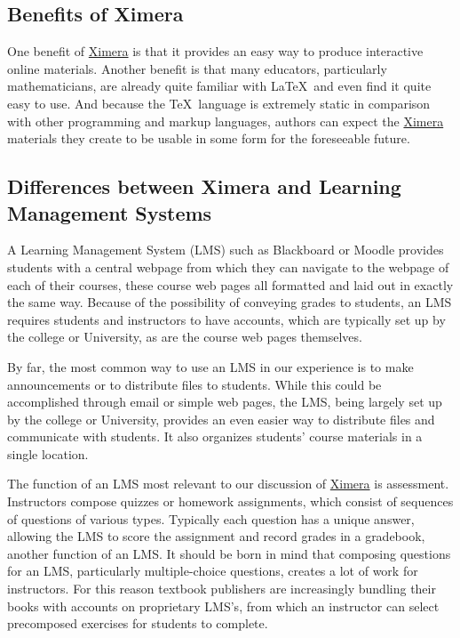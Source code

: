 \documentclass{ximera}
\begin{document}
\subsection{Benefits of Ximera}
One benefit of \href{http://ximera.osu.edu}{\sf Ximera}
is that it provides an easy way to produce interactive online materials.
Another benefit is that many educators, particularly mathematicians,
are already quite familiar with \LaTeX\ and
even find it quite easy to use.
And because the \TeX\ language is extremely static in comparison with
other programming and markup languages, authors can expect
the \href{http://ximera.osu.edu}{\sf Ximera}
materials they create to be usable in some
form for the foreseeable future.

\subsection{Differences between Ximera and Learning Management Systems}
A Learning Management System
(LMS) such as Blackboard or Moodle
provides students with a central webpage from
which they can navigate to the webpage of
each of their courses, these course web pages
all formatted and laid out in exactly the same way.
Because of the possibility of conveying grades
to students, an LMS requires students
and instructors to have accounts,
which are typically set up by
the college or University, as are the course
web pages themselves.

By far, the most common way to use an LMS in our
experience is to make announcements or to distribute
files to students.  While this could be accomplished through email
or simple web pages, the LMS, being
largely set up by the college or University, provides
an even easier way to distribute files and communicate with students.
It also organizes students' course materials in a single location.

The function of an LMS most relevant to our discussion
of \href{http://ximera.osu.edu}{\sf Ximera} is assessment.
Instructors compose quizzes or homework assignments,
which consist of sequences of questions of various types.
Typically each question has a unique answer, allowing
the LMS to score the assignment and record grades in a
gradebook, another function of an LMS.
It should be born in mind that composing questions for
an LMS, particularly multiple-choice questions, creates a lot of work
for instructors. For this reason textbook publishers
are increasingly bundling their books with accounts
on proprietary LMS's, from which an
instructor can select precomposed exercises for students
to complete.
\end{document}
